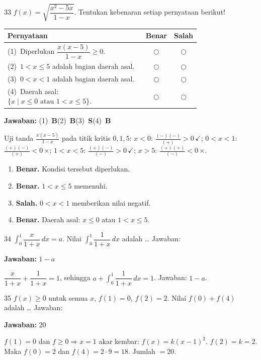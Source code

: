 \documentclass[11pt]{article}
\newcommand{\jawaban}[1]{%
  \noindent\colorbox{gold!30}{\parbox{\dimexpr\linewidth-2\fboxsep\relax}{%
    \textbf{Jawaban:} #1}}\par\smallskip}
\begin{document}
\begin{soal}{33}
$f(x)=\sqrt{\dfrac{x^2-5x}{1-x}}$.
Tentukan kebenaran setiap pernyataan berikut!

\par\smallskip
{\renewcommand{\arraystretch}{1.4}%
\begin{tabular}{@{}p{0.76\linewidth}cc@{}}
\hline\textbf{Pernyataan}&\textbf{Benar}&\textbf{Salah}\\\hline
(1)~Diperlukan $\dfrac{x(x-5)}{1-x}\geq0$.&$\bigcirc$&$\bigcirc$\\
(2)~$1<x\leq5$ adalah bagian daerah asal.&$\bigcirc$&$\bigcirc$\\
(3)~$0<x<1$ adalah bagian daerah asal.&$\bigcirc$&$\bigcirc$\\
(4)~Daerah asal: $\{x\mid x\leq0\text{ atau }1<x\leq5\}$.&$\bigcirc$&$\bigcirc$\\\hline
\end{tabular}}
\end{soal}
\begin{pembox}
\jawaban{(1)~\textbf{B}\quad(2)~\textbf{B}\quad(3)~\textbf{S}\quad(4)~\textbf{B}}
Uji tanda $\tfrac{x(x-5)}{1-x}$ pada titik kritis $0,1,5$:
$x<0$: $\frac{(-)(-)}{(+)}>0$\,$\checkmark$;\; $0<x<1$: $\frac{(+)(-)}{(+)}<0$\,$\times$;\;
$1<x<5$: $\frac{(+)(-)}{(-)}>0$\,$\checkmark$;\; $x>5$: $\frac{(+)(+)}{(-)}<0$\,$\times$.
\begin{enumerate}[leftmargin=*,topsep=2pt,itemsep=2pt]
\item \textbf{Benar.} Kondisi tersebut diperlukan.
\item \textbf{Benar.} $1<x\leq5$ memenuhi.
\item \textbf{Salah.} $0<x<1$ memberikan nilai negatif.
\item \textbf{Benar.} Daerah asal: $x\leq0$ atau $1<x\leq5$.
\end{enumerate}
\end{pembox}

\begin{soal}{34}
$\displaystyle\int_0^1\dfrac{x}{1+x}\,dx=a$.
Nilai $\displaystyle\int_0^1\dfrac{1}{1+x}\,dx$ adalah \ldots\hfill
Jawaban:\enspace\underline{\hspace{3cm}}
\end{soal}
\begin{pembox}
\jawaban{$1-a$}
$\dfrac{x}{1+x}+\dfrac{1}{1+x}=1$, sehingga $a+\displaystyle\int_0^1\dfrac{1}{1+x}\,dx=1$.
Jawaban: $1-a$.
\end{pembox}

\begin{soal}{35}
$f(x)\geq0$ untuk semua $x$, $f(1)=0$, $f(2)=2$. Nilai $f(0)+f(4)$ adalah \ldots\hfill
Jawaban:\enspace\underline{\hspace{3cm}}
\end{soal}
\begin{pembox}
\jawaban{$20$}
$f(1)=0$ dan $f\geq0\Rightarrow x=1$ akar kembar: $f(x)=k(x-1)^2$.
$f(2)=k=2$. Maka $f(0)=2$ dan $f(4)=2\cdot9=18$. Jumlah $=20$.
\end{pembox}
\end{document}
